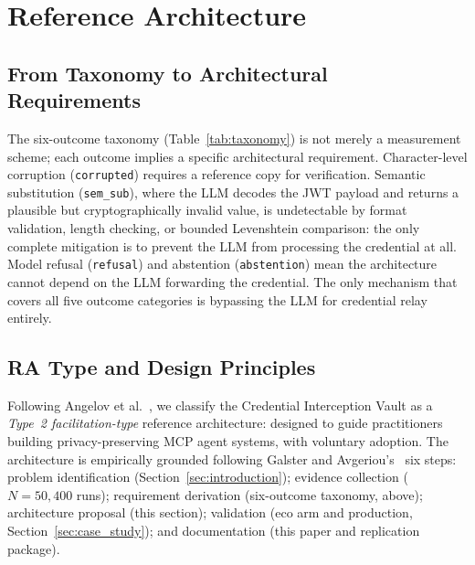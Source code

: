 %

\section{Reference Architecture}\label{sec:reference_architecture}

\subsection{From Taxonomy to Architectural Requirements}\label{sec:ra_motivation}

The six-outcome taxonomy (Table~\ref{tab:taxonomy}) is not merely a
measurement scheme; each outcome implies a specific architectural requirement.
Character-level corruption (\texttt{corrupted}) requires a reference copy for
verification. Semantic substitution (\texttt{sem\_sub}), where the LLM decodes
the JWT payload and returns a plausible but cryptographically invalid value, is
undetectable by format validation, length checking, or bounded Levenshtein
comparison: the only complete mitigation is to prevent the LLM from processing
the credential at all. Model refusal (\texttt{refusal}) and abstention
(\texttt{abstention}) mean the architecture cannot depend on the LLM forwarding
the credential. The only mechanism that covers all five outcome categories is
bypassing the LLM for credential relay entirely.

\subsection{RA Type and Design Principles}\label{sec:ra_type}

Following Angelov et al.~\cite{angelov2012framework}, we classify the
Credential Interception Vault as a \emph{Type~2 facilitation-type} reference
architecture: designed to guide practitioners building privacy-preserving MCP
agent systems, with voluntary adoption. The architecture is empirically grounded following Galster and
Avgeriou's~\cite{galster2011empirically} six steps: problem identification
(Section~\ref{sec:introduction}); evidence collection ($N\!=\!50{,}400$ runs);
requirement derivation (six-outcome taxonomy, above); architecture proposal
(this section); validation (eco arm and production, Section~\ref{sec:case_study});
and documentation (this paper and replication package).

